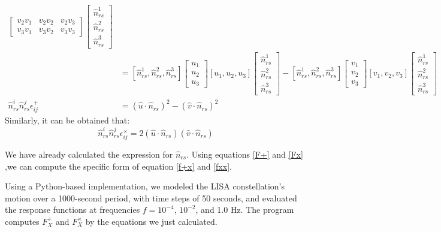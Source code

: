 \documentclass{article}
\begin{document}
\begin{align}
\begin{bmatrix}
			v_2 v_1 & v_2 v_2 & v_2 v_3 \\
			v_3 v_1 & v_3 v_2 & v_3 v_3 
		\end{bmatrix}
		\begin{bmatrix}
			\hat{n}^{1}_{rs} \\
			\hat{n}^{2}_{rs} \\
			\hat{n}^{3}_{rs}
		\end{bmatrix} \\
		&= [\hat{n}^{1}_{rs} , \hat{n}^{2}_{rs} , \hat{n}^{3}_{rs}]
		\begin{bmatrix}
			u_1 \\
			u_2 \\
			u_3 
		\end{bmatrix}
		[u_1, u_2 , u_3]
		\begin{bmatrix}
			\hat{n}^{1}_{rs} \\
			\hat{n}^{2}_{rs} \\
			\hat{n}^{3}_{rs}
		\end{bmatrix}
		-
		[\hat{n}^{1}_{rs} , \hat{n}^{2}_{rs} , \hat{n}^{3}_{rs}]
		\begin{bmatrix}
			v_1 \\
			v_2 \\
			v_3 
		\end{bmatrix}
		[v_1, v_2 , v_3]
		\begin{bmatrix}
			\hat{n}^{1}_{rs} \\
			\hat{n}^{2}_{rs} \\
			\hat{n}^{3}_{rs}
		\end{bmatrix} \\
		\hat{n}^i_{rs} \hat{n}^j_{rs} \epsilon^{+}_{ij} &=(\hat{u} \cdot  \hat{n}_{rs})^2- (\hat{v} \cdot \hat{n}_{rs})^2
 	\end{align}
	Similarly, it can be obtained that:
	\begin{equation}
		\hat{n}^i_{rs} \hat{n}^j_{rs} \epsilon^{\times}_{ij} = 2 (\hat{u} \cdot \hat{n}_{rs}) (\hat{v} \cdot \hat{n}_{rs})
	\end{equation}
	
	We have already calculated the expression for $\hat{n}_{rs}$. Using equations \ref{F+} and \ref{Fx} ,we can compute the specific form of equation \ref{f+x} and \ref{fxx}.
	
	
	Using a Python-based implementation, we modeled the LISA constellation's motion over a 1000-second period, with time steps of 50 seconds, and evaluated the response functions at frequencies $f = 10^{-4}$, $10^{-2}$, and 1.0 Hz. The program computes $F^{+}_X$ and $F^{\times}_X$ by the equations we just calculated.
	
\end{document}
